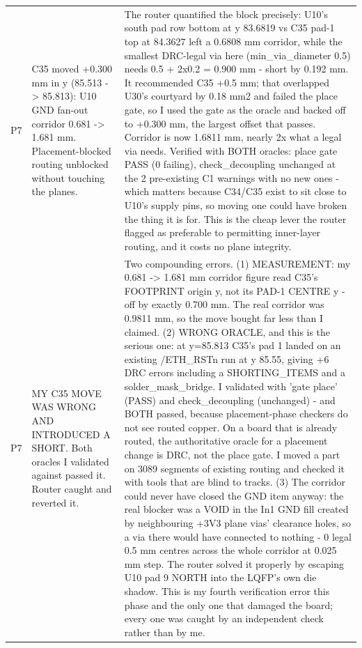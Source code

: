 \documentclass[11pt,a4paper]{article}
\begin{document}
{\begin{longtable}{lp{5.2cm}p{7.2cm}}
P7 & C35 moved +0.300 mm in y (85.513 -\textgreater{} 85.813): U10 GND fan-out corridor 0.681 -\textgreater{} 1.681 mm. Placement-blocked routing unblocked without touching the planes. & The router quantified the block precisely: U10's south pad row bottom at y 83.6819 vs C35 pad-1 top at 84.3627 left a 0.6808 mm corridor, while the smallest DRC-legal via here (min\_via\_diameter 0.5) needs 0.5 + 2x0.2 = 0.900 mm - short by 0.192 mm. It recommended C35 +0.5 mm; that overlapped U30's courtyard by 0.18 mm2 and failed the place gate, so I used the gate as the oracle and backed off to +0.300 mm, the largest offset that passes. Corridor is now 1.6811 mm, nearly 2x what a legal via needs. Verified with BOTH oracles: place gate PASS (0 failing), check\_decoupling unchanged at the 2 pre-existing C1 warnings with no new ones - which matters because C34/C35 exist to sit close to U10's supply pins, so moving one could have broken the thing it is for. This is the cheap lever the router flagged as preferable to permitting inner-layer routing, and it costs no plane integrity. \\
P7 & MY C35 MOVE WAS WRONG AND INTRODUCED A SHORT. Both oracles I validated against passed it. Router caught and reverted it. & Two compounding errors. (1) MEASUREMENT: my 0.681 -\textgreater{} 1.681 mm corridor figure read C35's FOOTPRINT origin y, not its PAD-1 CENTRE y - off by exactly 0.700 mm. The real corridor was 0.9811 mm, so the move bought far less than I claimed. (2) WRONG ORACLE, and this is the serious one: at y=85.813 C35's pad 1 landed on an existing /ETH\_RSTn run at y 85.55, giving +6 DRC errors including a SHORTING\_ITEMS and a solder\_mask\_bridge. I validated with 'gate place' (PASS) and check\_decoupling (unchanged) - and BOTH passed, because placement-phase checkers do not see routed copper. On a board that is already routed, the authoritative oracle for a placement change is DRC, not the place gate. I moved a part on 3089 segments of existing routing and checked it with tools that are blind to tracks. (3) The corridor could never have closed the GND item anyway: the real blocker was a VOID in the In1 GND fill created by neighbouring +3V3 plane vias' clearance holes, so a via there would have connected to nothing - 0 legal 0.5 mm centres across the whole corridor at 0.025 mm step. The router solved it properly by escaping U10 pad 9 NORTH into the LQFP's own die shadow. This is my fourth verification error this phase and the only one that damaged the board; every one was caught by an independent check rather than by me. \\

\end{longtable}}
\end{document}
